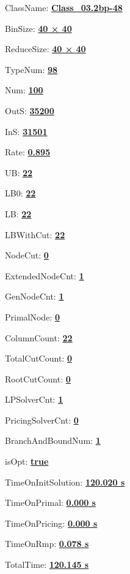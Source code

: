 \documentclass[11pt]{article}
\begin{document}
\pagestyle{empty}


ClassName: \underline{\textbf{Class_03.2bp-48}}
\par
BinSize: \underline{\textbf{40 × 40}}
\par
ReduceSize: \underline{\textbf{40 × 40}}
\par
TypeNum: \underline{\textbf{98}}
\par
Num: \underline{\textbf{100}}
\par
OutS: \underline{\textbf{35200}}
\par
InS: \underline{\textbf{31501}}
\par
Rate: \underline{\textbf{0.895}}
\par
UB: \underline{\textbf{22}}
\par
LB0: \underline{\textbf{22}}
\par
LB: \underline{\textbf{22}}
\par
LBWithCut: \underline{\textbf{22}}
\par
NodeCut: \underline{\textbf{0}}
\par
ExtendedNodeCnt: \underline{\textbf{1}}
\par
GenNodeCnt: \underline{\textbf{1}}
\par
PrimalNode: \underline{\textbf{0}}
\par
ColumnCount: \underline{\textbf{22}}
\par
TotalCutCount: \underline{\textbf{0}}
\par
RootCutCount: \underline{\textbf{0}}
\par
LPSolverCnt: \underline{\textbf{1}}
\par
PricingSolverCnt: \underline{\textbf{0}}
\par
BranchAndBoundNum: \underline{\textbf{1}}
\par
isOpt: \underline{\textbf{true}}
\par
TimeOnInitSolution: \underline{\textbf{120.020 s}}
\par
TimeOnPrimal: \underline{\textbf{0.000 s}}
\par
TimeOnPricing: \underline{\textbf{0.000 s}}
\par
TimeOnRmp: \underline{\textbf{0.078 s}}
\par
TotalTime: \underline{\textbf{120.145 s}}
\par
\newpage


\end{document}
